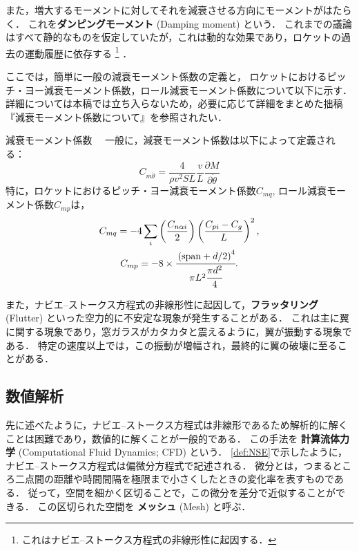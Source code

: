 \documentclass[uplatex,dvipdfmx,a4j,11pt]{jsreport}
\newcommand{\keyword}[1]{\textcolor{mainblue}{\textbf{#1}}}
\numberwithin{equation}{chapter}
\begin{document}
また，増大するモーメントに対してそれを減衰させる方向にモーメントがはたらく．
これを\keyword{ダンピングモーメント} (Damping moment) という．
これまでの議論はすべて静的なものを仮定していたが，これは動的な効果であり，ロケットの過去の運動履歴に依存する
\footnote{これはナビエ--ストークス方程式の非線形性に起因する．} ．

ここでは，簡単に一般の減衰モーメント係数の定義と，
ロケットにおけるピッチ・ヨー減衰モーメント係数，ロール減衰モーメント係数について以下に示す．
詳細については本稿では立ち入らないため，必要に応じて詳細をまとめた拙稿『減衰モーメント係数について』を参照されたい．
\begin{definition}{減衰モーメント係数}{}{}
  　一般に，減衰モーメント係数は以下によって定義される：
  \begin{equation}
  C_{m\dot{\theta}} = \frac{4}{\rho v^2 S L}\frac{v}{L}\frac{\partial M}{\partial\dot{\theta}} \label{fte_def}
\end{equation}
特に，ロケットにおけるピッチ・ヨー減衰モーメント係数$C_{mq}$, ロール減衰モーメント係数$C_{mp}$は，
\begin{gather}
  C_{mq} = - 4 \sum_i \left(\frac{C_{n\alpha i}}{2}\right)\left(\frac{C_{pi} - C_{g}}{L}\right)^2,\\
  C_{mp} = - 8 \times \cfrac{\left(\mathrm{span} + d/2\right)^4}{\pi L^2 \cfrac{\pi d^2}{4}}.
\end{gather}
\end{definition}

\enskip

また，ナビエ--ストークス方程式の非線形性に起因して，\keyword{フラッタリング} (Flutter) といった空力的に不安定な現象が発生することがある．
これは主に翼に関する現象であり，窓ガラスがカタカタと震えるように，翼が振動する現象である．
特定の速度以上では，この振動が増幅され，最終的に翼の破壊に至ることがある．

\subsection{数値解析}
先に述べたように，ナビエ--ストークス方程式は非線形であるため解析的に解くことは困難であり，数値的に解くことが一般的である．
この手法を \keyword{計算流体力学} (Computational Fluid Dynamics; CFD) という．
\cref{def:NSE}で示したように，ナビエ--ストークス方程式は偏微分方程式で記述される．
微分とは，つまるところ二点間の距離や時間間隔を極限まで小さくしたときの変化率を表すものである．
従って，空間を細かく区切ることで，この微分を差分で近似することができる．
この区切られた空間を \keyword{メッシュ} (Mesh) と呼ぶ．
\end{document}
